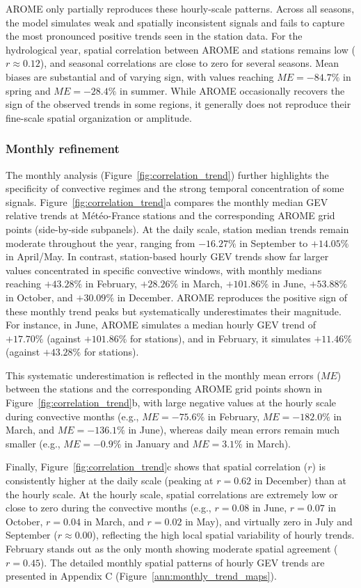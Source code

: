 \documentclass[hess, manuscript]{copernicus}
\begin{document}
AROME only partially reproduces these hourly-scale patterns. Across all seasons, the model simulates weak and spatially inconsistent signals and fails to capture the most pronounced positive trends seen in the station data. For the hydrological year, spatial correlation between AROME and stations remains low ($r \approx 0.12$), and seasonal correlations are close to zero for several seasons. Mean biases are substantial and of varying sign, with values reaching $ME = -84.7\%$ in spring and $ME = -28.4\%$ in summer. While AROME occasionally recovers the sign of the observed trends in some regions, it generally does not reproduce their fine-scale spatial organization or amplitude.

\subsubsection{Monthly refinement}

The monthly analysis (Figure~\ref{fig:correlation_trend}) further highlights the specificity of convective regimes and the strong temporal concentration of some signals. Figure~\ref{fig:correlation_trend}a compares the monthly median GEV relative trends at Météo-France stations and the corresponding AROME grid points (side-by-side subpanels). At the daily scale, station median trends remain moderate throughout the year, ranging from $-16.27\%$ in September to $+14.05\%$ in April/May. In contrast, station-based hourly GEV trends show far larger values concentrated in specific convective windows, with monthly medians reaching $+43.28\%$ in February, $+28.26\%$ in March, $+101.86\%$ in June, $+53.88\%$ in October, and $+30.09\%$ in December. AROME reproduces the positive sign of these monthly trend peaks but systematically underestimates their magnitude. For instance, in June, AROME simulates a median hourly GEV trend of $+17.70\%$ (against $+101.86\%$ for stations), and in February, it simulates $+11.46\%$ (against $+43.28\%$ for stations).

This systematic underestimation is reflected in the monthly mean errors ($ME$) between the stations and the corresponding AROME grid points shown in Figure~\ref{fig:correlation_trend}b, with large negative values at the hourly scale during convective months (e.g., $ME = -75.6\%$ in February, $ME = -182.0\%$ in March, and $ME = -136.1\%$ in June), whereas daily mean errors remain much smaller (e.g., $ME = -0.9\%$ in January and $ME = 3.1\%$ in March).

Finally, Figure~\ref{fig:correlation_trend}c shows that spatial correlation ($r$) is consistently higher at the daily scale (peaking at $r = 0.62$ in December) than at the hourly scale. At the hourly scale, spatial correlations are extremely low or close to zero during the convective months (e.g., $r = 0.08$ in June, $r = 0.07$ in October, $r = 0.04$ in March, and $r = 0.02$ in May), and virtually zero in July and September ($r \approx 0.00$), reflecting the high local spatial variability of hourly trends. February stands out as the only month showing moderate spatial agreement ($r = 0.45$). The detailed monthly spatial patterns of hourly GEV trends are presented in Appendix C (Figure~\ref{ann:monthly_trend_maps}).
\end{document}

